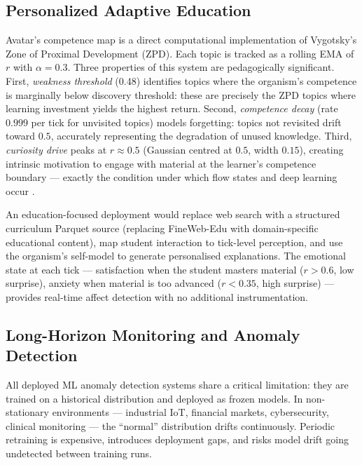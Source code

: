 \documentclass[12pt,a4paper]{article}
\begin{document}
\subsection{Personalized Adaptive Education}

Avatar's competence map is a direct computational implementation of Vygotsky's Zone of
Proximal Development (ZPD). Each topic is tracked as a rolling EMA of $r$ with
$\alpha=0.3$. Three properties of this system are pedagogically significant. First,
\emph{weakness threshold} (0.48) identifies topics where the organism's competence is
marginally below discovery threshold: these are precisely the ZPD topics where learning
investment yields the highest return. Second, \emph{competence decay} (rate $0.999$ per
tick for unvisited topics) models forgetting: topics not revisited drift toward $0.5$,
accurately representing the degradation of unused knowledge. Third, \emph{curiosity
drive} peaks at $r \approx 0.5$ (Gaussian centred at $0.5$, width $0.15$), creating
intrinsic motivation to engage with material at the learner's competence boundary ---
exactly the condition under which flow states and deep learning occur
\cite{schmidhuber2010formal}.

An education-focused deployment would replace web search with a structured curriculum
Parquet source (replacing FineWeb-Edu with domain-specific educational content), map
student interaction to tick-level perception, and use the organism's self-model to
generate personalised explanations. The emotional state at each tick --- satisfaction
when the student masters material ($r > 0.6$, low surprise), anxiety when material is
too advanced ($r < 0.35$, high surprise) --- provides real-time affect detection with no
additional instrumentation.

\subsection{Long-Horizon Monitoring and Anomaly Detection}

All deployed ML anomaly detection systems share a critical limitation: they are trained
on a historical distribution and deployed as frozen models. In non-stationary environments
--- industrial IoT, financial markets, cybersecurity, clinical monitoring --- the
``normal'' distribution drifts continuously. Periodic retraining is expensive,
introduces deployment gaps, and risks model drift going undetected between training runs.
\end{document}
